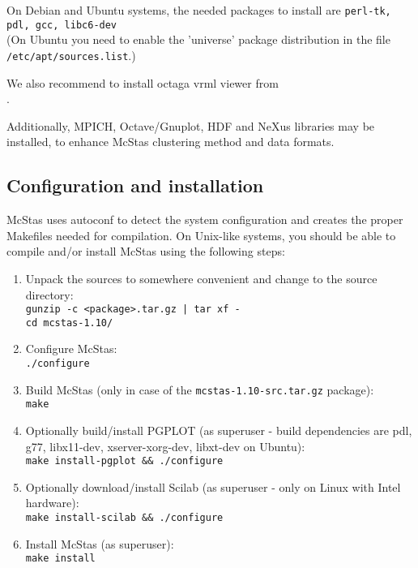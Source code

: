 \noindent On Debian and Ubuntu systems, the
needed packages to install are \texttt{perl-tk, pdl, gcc,
  libc6-dev} \\(On Ubuntu you need to enable the 'universe' package
distribution in the file \\\verb+/etc/apt/sources.list+.)

\noindent We also recommend to install octaga vrml viewer from
\\.

\noindent Additionally, MPICH, Octave/Gnuplot, HDF and NeXus libraries may be installed, to enhance McStas clustering method and data formats.

\subsection{Configuration and installation}
McStas uses autoconf to detect the system configuration and creates the
proper Makefiles needed for compilation. On Unix-like systems, you
should be able to compile and/or install McStas using the following steps:
\begin{enumerate}
\item{Unpack the sources to somewhere convenient and change to the
    source directory:\\
  \texttt{gunzip -c <package>.tar.gz | tar xf -}\\
  \texttt{cd mcstas-1.10/}}
\item{Configure McStas:\\
  \texttt{./configure}}
\item{Build McStas (only in case of the \verb+mcstas-1.10-src.tar.gz+ package):\\
  \texttt{make}}
\item{Optionally build/install PGPLOT (as superuser - build
    dependencies are pdl, g77, libx11-dev, xserver-xorg-dev, libxt-dev
    on Ubuntu):\\
    \texttt{make install-pgplot \&\& ./configure}
    \label{pg_install}}
\item{Optionally download/install Scilab (as superuser - only on Linux
    with Intel hardware):\\
    \texttt{make install-scilab \&\& ./configure}
    \label{sci_install}}
\item{Install McStas (as superuser):\\
  \texttt{make install}
\label{makeinst}}
\end{enumerate}



